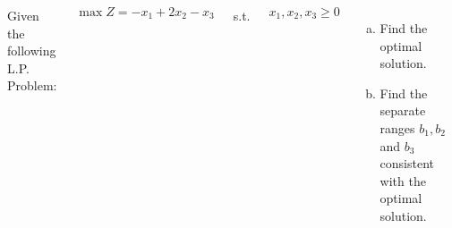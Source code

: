 \begin{frameExample}{}{}
\begin{columns}
  Given the following L.P. Problem:

  \[ \max Z = -x_1 + 2x_2 - x_3 \]

  \vspace{6mm}
  s.t.

  \vspace{6mm}

  $x_1, x_2, x_3 \geq 0$
  \begin{enumerate}[a)] \justifying \parskip3mm
  \item Find the optimal solution.
  \item   Find the separate ranges $b_1, b_2 $ and $b_3$ consistent with the optimal solution.
  \end{enumerate}
\end{columns}  
\end{frameExample}


